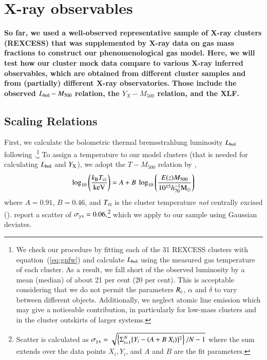 \documentclass[useAMS,usenatbib]{mn2e}
\begin{document}
\section{X-ray  observables}
\label{sec:4}

{\bf So far, we used a well-observed representative sample of X-ray clusters
(REXCESS) that was supplemented by X-ray data on gas mass fractions to construct
our phenomenological gas model.  Here, we will test how our cluster mock data
compare to various X-ray inferred observables, which are obtained from different
cluster samples and from (partially) different X-ray observatories. Those
include the observed $L_{{\mathrm{bol}}} - M_{500}$ relation, the $Y_X - M_{500}$
relation, and the XLF.}

\subsection{Scaling Relations}
\label{sec:Xscaling}

First, we calculate the bolometric thermal bremsstrahlung luminosity
$L_{{\mathrm{bol}}}$ following \cite{1988xrec.book.....S}.\footnote{We check our
  procedure by fitting each of the 31 REXCESS clusters with
  equation~(\ref{eq:gnfw}) and calculate $L_{{\mathrm{bol}}}$ using the measured gas
  temperature of each cluster. As a result, we fall short of the observed
  luminosity by a mean (median) of about 21 per cent (20 per cent). This is
  acceptable considering that we do not permit the parameters $R_{{\mathrm{c}}}$,
  $\alpha$ and $\delta$ to vary between different objects. Additionally, we
  neglect atomic line emission which may give a noticeable contribution, in
  particularly for low-mass clusters and in the cluster outskirts of larger
  systems.}  To assign a temperature to our model clusters (that is needed for
calculating $L_{{\mathrm{bol}}}$ and $Y_{{\mathrm{X}}}$), we adopt the $T-M_{500}$
relation by \cite{2010MNRAS.406.1773M},
\begin{equation}
\log_{10} \left( \frac{k_{{\mathrm{B}}}T_{{\mathrm{ci}}}}{{\mathrm{keV}}} \right) = 
A + B~\log_{10} \left( \frac{E(z) M_{500}}{10^{15} h_{70}^{-1} {\mathrm{M_{\odot}}}} \right)
\label{eq:temp}
\end{equation}
where $A=0.91$, $B=0.46$, and $T_{{\mathrm{ci}}}$ is the cluster temperature
\emph{not} centrally excised
(\citealp{2010MNRAS.406.1773M}). \cite{2010MNRAS.406.1773M} report a scatter of
$\sigma_{{\mathrm{yx}}} = 0.06,$\footnote{Scatter is calculated as $\sigma_{{\mathrm{yx}}}
  = \sqrt{ \left\{ \Sigma_{i=1}^{N} [Y_{i}-(A+B~X_{i})]^{2}\right\} / N-1}$
  where the sum extends over the data points $X_{i}, Y_{i}$, and $A$ and $B$ are
  the fit parameters.} which we apply to our sample using Gaussian deviates.
\end{document}
